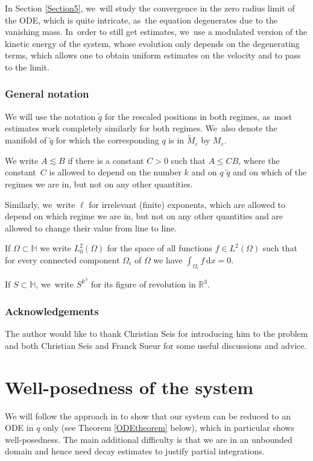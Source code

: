 \documentclass[10pt]{amsart}
\let\epsilon\varepsilon
\theoremstyle{definition}
\newcommand\R{\mathbb{R}}
\newcommand\dd{\,\mathrm{d}}
\newcommand\dx{\dd x}
\let\eps\epsilon
\begin{document}
In Section \ref{Section5}, we~will study the convergence in the zero radius limit of the ODE, which is quite intricate, as~the equation degenerates due to the vanishing mass. In~order to still get estimates, we~use a modulated version of the kinetic energy of the system, whose evolution only depends on the degenerating terms, which allows one to obtain uniform estimates on the velocity and to pass to the limit.

\subsubsection*{General notation}
We will use the notation $\tilde{q}$ for the rescaled positions in both regimes, as~most estimates work completely similarly for both regimes. We~also denote the manifold of $\tilde{q}$ for which the corresponding $q$ is in $\tilde{M}_\eps$ by $M_\eps$.

We write $A\lesssim B$ if there is a constant $C>0$ such that $A\leq CB$, where the constant~$C$ is allowed to depend on the number $k$ and on $q$ \resp $\tilde{q}$ and on which of the regimes we are in, but not on any other quantities.

Similarly, we~write $\ell$ for irrelevant (finite) exponents, which are allowed to depend on which regime we are in, but not on any other quantities and are allowed to change their value from line to line.

If $\Omega\subset \mathbb{H}$ we write $L_0^2(\Omega)$ for the space of all functions $f\in L^2(\Omega)$ such that for every connected component $\Omega_i$ of $\Omega$ we have $\int_{\Omega_i}f\dx=0$.

If $S\subset \mathbb{H}$, we~write $S^{\R^3}$ for its figure of revolution in $\R^3$.

\subsubsection*{Acknowledgements}
The author would like to thank Christian Seis for introducing him to the problem and both Christian Seis and Franck Sueur for some useful discussions and advice.

\section{Well-posedness of the system}\label{Section2}
We will follow the approach in \cite{GlassMunnierSueur2} to show that our system can be reduced to an ODE in $q$ only (see Theorem \ref{ODEtheorem} below), which in particular shows well-posedness. The main additional difficulty is that we are in an unbounded domain and hence need decay estimates to justify partial integrations.
\end{document}
